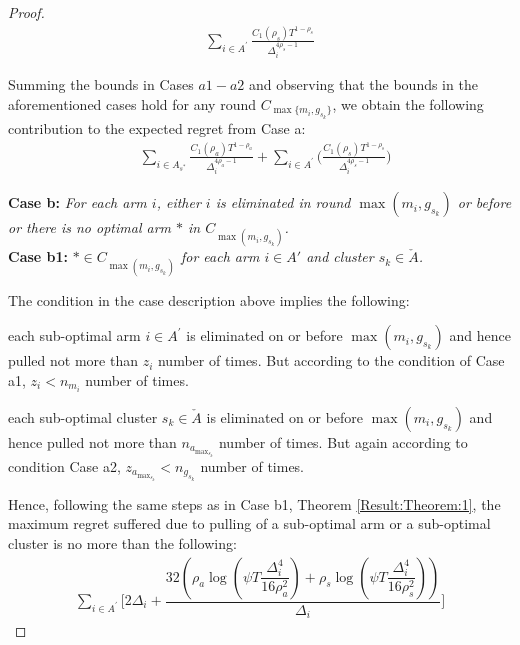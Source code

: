 \begin{proof}
\begin{align*}
\sum_{i\in A^{'}}\frac{C_{1}(\rho_{s})T^{1-\rho_{s}}}{\Delta_{i}^{4\rho_{s}-1}}
\end{align*}



Summing the bounds in Cases $a1-a2$ and observing that the bounds in the aforementioned cases hold for any round $C_{\max \lbrace m_i,g_{s_k}\rbrace}$, we obtain the following contribution to the expected regret from Case a:
\begin{align*}
&\sum_{i\in A_{s^*}} \frac{C_{1}(\rho_{a})T^{1-\rho_{a}}}{\Delta_{i}^{4\rho_{a}-1}} + \sum_{i\in A^{'}}\bigg(\frac{C_{1}(\rho_{s})T^{1-\rho_{s}}}{\Delta_{i}^{4\rho_{s}-1}}\bigg)
\end{align*}



\textbf{Case b:} \textit{For each arm $i$, either ${i}$ is eliminated in round $\max (m_{i},g_{s_{k}})$ or before or there is no optimal arm ${*}$ in $C_{\max(m_{i},g_{s_{k}})}$.} \\

\textbf{Case b1:} \textit{${*}\in C_{\max(m_{i},g_{s_{k}})}$ for each arm $i \in A'$ and cluster $s_k \in \check A$.} 


The condition in the case description above implies the following: \\
\begin{inparaenum}[\bfseries (i)]
\item each sub-optimal arm ${i}\in A^{'}$ is  eliminated on or before $\max (m_{i},g_{s_{k}})$ and hence  pulled not more than $z_{i}$ number of times. But according to the condition of Case a1, $z_{i} < n_{m_{i}}$ number of times.\\
\item each sub-optimal cluster $s_k \in \check A$ is eliminated on or before $\max (m_{i},g_{s_{k}})$ and hence  pulled not more than $n_{a_{\max_{s_{k}}}}$ number of times. But again according to condition Case a2,  $z_{a_{\max_{s_{k}}}} < n_{g_{s_{k}}}$ number of times.
\end{inparaenum}

Hence, following the same steps as in Case b1, Theorem \ref{Result:Theorem:1}, the maximum regret suffered due to pulling of a sub-optimal arm or a sub-optimal cluster is no more than the following:
 \begin{align*}
\sum_{i\in A^{'}}\!\bigg[ 2\Delta_{i}+\dfrac{32(\rho_{a}\log{(\psi T\dfrac{\Delta_{i}^{4}}{16\rho_{a}^{2}})} + \rho_{s}\log{(\psi T\dfrac{\Delta_{i}^{4}}{16\rho_{s}^{2}})})}{\Delta_{i}} \bigg]
 \end{align*}


\end{proof}
